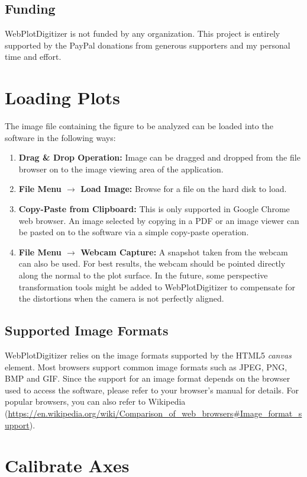 \documentclass[letterpaper, 11pt]{article}
\begin{document}
\subsection{Funding}
WebPlotDigitizer is not funded by any organization. This project is entirely supported by the PayPal donations from generous supporters and my personal time and effort.

\section{Loading Plots}
The image file containing the figure to be analyzed can be loaded into the software in the following ways:

\begin{enumerate}
\item{{\bf Drag \& Drop Operation:} Image can be dragged and dropped from the file browser on to the image viewing area of the application.}
\item{{\bf File Menu $\rightarrow$ Load Image:} Browse for a file on the hard disk to load.}
\item{{\bf Copy-Paste from Clipboard:} This is only supported in Google Chrome web browser. An image selected by copying in a PDF or an image viewer can be pasted on to the software via a simple copy-paste operation.}
\item{{\bf File Menu $\rightarrow$ Webcam Capture:} A snapshot taken from the webcam can also be used. For best results, the webcam should be pointed directly along the normal to the plot surface. In the future, some perspective transformation tools might be added to WebPlotDigitizer to compensate for the distortions when the camera is not perfectly aligned.}  
\end{enumerate}

\subsection{Supported Image Formats}
WebPlotDigitizer relies on the image formats supported by the HTML5 \emph{canvas} element. Most browsers support common image formats such as JPEG, PNG, BMP and GIF. Since the support for an image format depends on the browser used to access the software, please refer to your browser's manual for details. For popular browsers, you can also refer to Wikipedia (\url{https://en.wikipedia.org/wiki/Comparison_of_web_browsers#Image_format_support}).

\section{Calibrate Axes}
\end{document}
